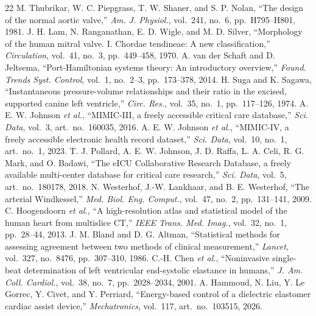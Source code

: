 \documentclass[journal]{IEEEtran}
\begin{document}
\begin{thebibliography}{22}
 M. Thubrikar, W. C. Piepgrass, T. W. Shaner, and S. P. Nolan, ``The design of the normal aortic valve,'' \emph{Am. J. Physiol.}, vol.~241, no.~6, pp.~H795--H801, 1981.
 J. H. Lam, N. Ranganathan, E. D. Wigle, and M. D. Silver, ``Morphology of the human mitral valve. I. Chordae tendineae: A new classification,'' \emph{Circulation}, vol.~41, no.~3, pp.~449--458, 1970.
 A. van der Schaft and D. Jeltsema, ``Port-Hamiltonian systems theory: An introductory overview,'' \emph{Found. Trends Syst. Control}, vol.~1, no.~2--3, pp.~173--378, 2014.
 H. Suga and K. Sagawa, ``Instantaneous pressure-volume relationships and their ratio in the excised, supported canine left ventricle,'' \emph{Circ. Res.}, vol.~35, no.~1, pp.~117--126, 1974.
 A. E. W. Johnson \emph{et al.}, ``MIMIC-III, a freely accessible critical care database,'' \emph{Sci. Data}, vol.~3, art.~no.~160035, 2016.
 A. E. W. Johnson \emph{et al.}, ``MIMIC-IV, a freely accessible electronic health record dataset,'' \emph{Sci. Data}, vol.~10, no.~1, art.~no.~1, 2023.
 T. J. Pollard, A. E. W. Johnson, J. D. Raffa, L. A. Celi, R. G. Mark, and O. Badawi, ``The eICU Collaborative Research Database, a freely available multi-center database for critical care research,'' \emph{Sci. Data}, vol.~5, art.~no.~180178, 2018.
 N. Westerhof, J.-W. Lankhaar, and B. E. Westerhof, ``The arterial Windkessel,'' \emph{Med. Biol. Eng. Comput.}, vol.~47, no.~2, pp.~131--141, 2009.
 C. Hoogendoorn \emph{et al.}, ``A high-resolution atlas and statistical model of the human heart from multislice CT,'' \emph{IEEE Trans. Med. Imag.}, vol.~32, no.~1, pp.~28--44, 2013.
 J. M. Bland and D. G. Altman, ``Statistical methods for assessing agreement between two methods of clinical measurement,'' \emph{Lancet}, vol.~327, no.~8476, pp.~307--310, 1986.
 C.-H. Chen \emph{et al.}, ``Noninvasive single-beat determination of left ventricular end-systolic elastance in humans,'' \emph{J. Am. Coll. Cardiol.}, vol.~38, no.~7, pp.~2028--2034, 2001.
 A. Hammoud, N. Liu, Y. Le Gorrec, Y. Civet, and Y. Perriard, ``Energy-based control of a dielectric elastomer cardiac assist device,'' \emph{Mechatronics}, vol.~117, art.~no.~103515, 2026.
\end{thebibliography}
\end{document}
